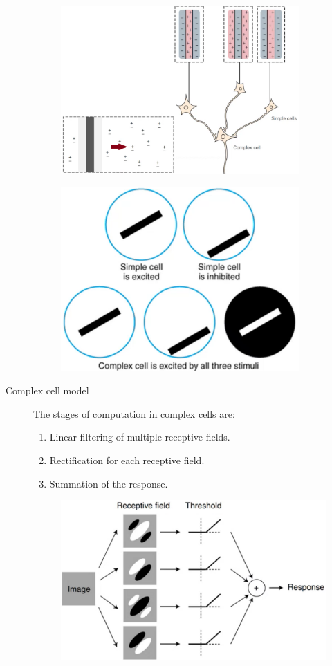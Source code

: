 \begin{figure}[H]
    \centering
    \begin{subfigure}{0.45\linewidth}
        \centering
        \includegraphics[width=0.85\linewidth]{./img/complex_cell.png}
    \end{subfigure}
    \begin{subfigure}{0.45\linewidth}
        \centering
        \includegraphics[width=0.6\linewidth]{./img/complex_cell_stimuli.png}
    \end{subfigure}
\end{figure}

\begin{description}
    \item[Complex cell model]
        The stages of computation in complex cells are:
        \begin{enumerate}
            \item Linear filtering of multiple receptive fields.
            \item Rectification for each receptive field.
            \item Summation of the response.
        \end{enumerate}

        \begin{figure}[H]
            \centering
            \includegraphics[width=0.4\linewidth]{./img/complex_cell_model.png}
        \end{figure}
\end{description}


